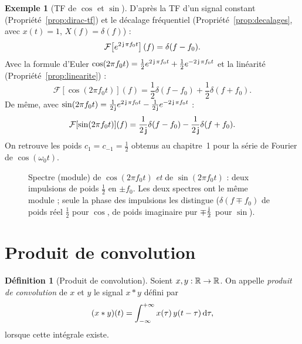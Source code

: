 \documentclass[a4paper,11pt]{article}
\theoremstyle{definition}
\newtheorem{definition}{Définition}[section]
\newtheorem{exemple}{Exemple}[section]
\newcommand{\highlight}[1]{{\color{niceblue}\emph{#1}}}
\begin{document}
\begin{exemple}[TF de $\cos$ et $\sin$]
    D'après la TF d'un signal constant (Propriété~\ref{prop:dirac-tf}) et le décalage fréquentiel (Propriété~\ref{prop:decalages}, avec $x(t)=1$, $X(f)=\delta(f)$) :
    $$
        \mathcal F\!\left[e^{2\operatorname{\mathsf{j}}\pi f_0t}\right](f) = \delta(f-f_0).
    $$
    Avec la formule d'Euler $\cos(2\pi f_0t) = \frac12e^{2\operatorname{\mathsf{j}}\pi f_0t} + \frac12e^{-2\operatorname{\mathsf{j}}\pi f_0t}$ et la linéarité (Propriété~\ref{prop:linearite}) :
    $$
        \mathcal F[\cos(2\pi f_0t)](f) = \frac12\delta(f-f_0) + \frac12\delta(f+f_0).
    $$
    De même, avec $\sin(2\pi f_0t) = \frac1{2\operatorname{\mathsf{j}}}e^{2\operatorname{\mathsf{j}}\pi f_0t} - \frac1{2\operatorname{\mathsf{j}}}e^{-2\operatorname{\mathsf{j}}\pi f_0t}$ :
    $$
        \mathcal F[\sin(2\pi f_0t)](f) = \frac1{2\operatorname{\mathsf{j}}}\delta(f-f_0) - \frac1{2\operatorname{\mathsf{j}}}\delta(f+f_0).
    $$
    On retrouve les poids $c_1=c_{-1}=\frac12$ obtenus au chapitre~1 pour la série de Fourier de $\cos(\omega_0t)$.
\end{exemple}

\begin{figure}[h]
    \centering
    \caption{Spectre (module) de $\cos(2\pi f_0t)$ \emph{et} de $\sin(2\pi f_0t)$ : deux impulsions de poids $\frac12$ en $\pm f_0$. Les deux spectres ont le même module ; seule la phase des impulsions les distingue ($\delta(f\mp f_0)$ de poids réel $\frac12$ pour $\cos$, de poids imaginaire pur $\mp\frac{\operatorname{\mathsf{j}}}2$ pour $\sin$).}
\end{figure}

\section{Produit de convolution}
\label{sec:convolution}

\begin{definition}[Produit de convolution]
    \label{def:convolution}
    Soient $x,y:{\mathbb{R}}\to{\mathbb{R}}$. On appelle \highlight{produit de convolution} de $x$ et $y$ le signal $x*y$ défini par
    $$
        (x*y)(t) = \int_{-\infty}^{+\infty} x(\tau)\,y(t-\tau)\,{\rm d} \tau,
    $$
    lorsque cette intégrale existe.
\end{definition}
\end{document}
